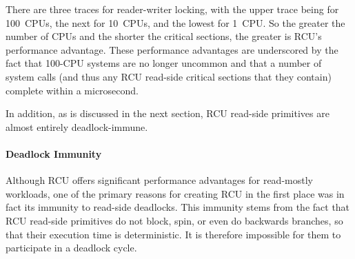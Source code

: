 \QuickQuizEnd

There are three traces for reader-writer locking, with the upper trace
being for 100~CPUs, the next for 10~CPUs, and the lowest for 1~CPU\@.
So the greater the number of CPUs and the shorter the critical sections,
the greater is RCU's performance advantage.
These performance advantages are underscored by the fact that 100-CPU
systems are no longer uncommon and that a number of system calls (and
thus any RCU read-side critical sections that they contain) complete
within a microsecond.

In addition, as is discussed in the next section,
RCU read-side primitives are almost entirely deadlock-immune.


\paragraph{Deadlock Immunity}

Although RCU offers significant performance advantages for
read-mostly workloads, one of the primary reasons for creating
RCU in the first place was in fact its immunity to read-side
deadlocks.
This immunity stems from the fact that
RCU read-side primitives do not block, spin, or even
do backwards branches, so that their execution time is deterministic.
It is therefore impossible for them to participate in a deadlock
cycle.


